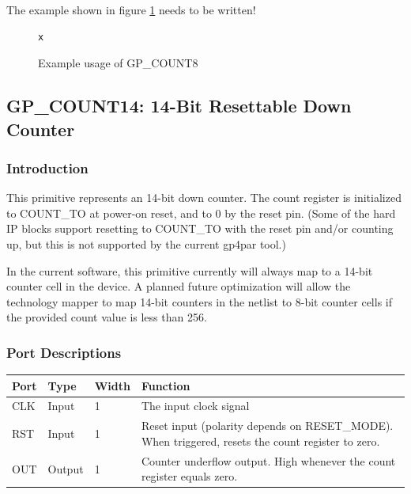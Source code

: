 \documentclass{article}
\begin{document}
The example shown in figure \ref{gp-count8-example} needs to be written!

\begin{figure}[h]
\begin{lstlisting}
x
\end{lstlisting}
\caption{Example usage of GP\_COUNT8}
\label{gp-count8-example}
\end{figure}


\pagebreak
\subsection{GP\_COUNT14: 14-Bit Resettable Down Counter}

\subsubsection{Introduction}
This primitive represents an 14-bit down counter. The count register is initialized to COUNT\_TO at power-on reset, and 
to 0 by the reset pin. (Some of the hard IP blocks support resetting to COUNT\_TO with the reset pin and/or counting 
up, but this is not supported by the current gp4par tool.)

In the current software, this primitive currently will always map to a 14-bit counter cell in the device. A planned 
future optimization will allow the technology mapper to map 14-bit counters in the netlist to 8-bit counter cells if 
the provided count value is less than 256.

\subsubsection{Port Descriptions}

\begin{tabularx}{5in}{|l|l|l|X|}
\hline
{\bfseries Port} & {\bfseries Type} & {\bfseries Width} & {\bfseries Function} \\
\hline
CLK & Input & 1 & The input clock signal\\
\hline
RST & Input & 1 & Reset input (polarity depends on RESET\_MODE). When triggered, resets the count register to zero. \\
\hline
OUT & Output & 1 & Counter underflow output. High whenever the count register equals zero. \\
\hline
\end{tabularx}
\end{document}
